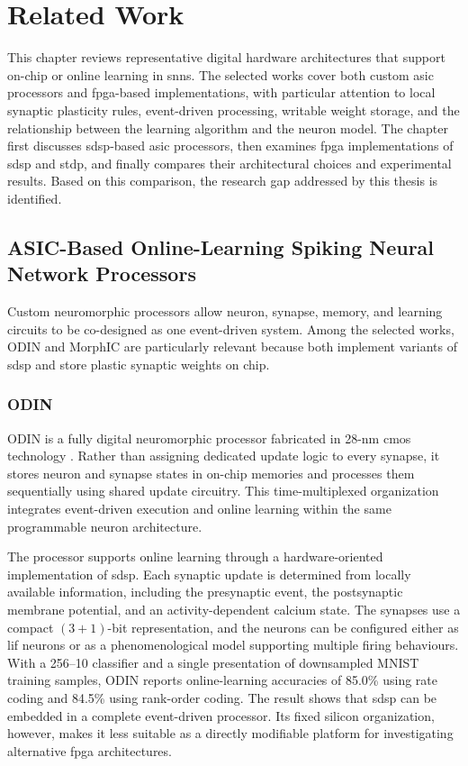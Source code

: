 \chapter{Related Work}
\label{sec:related_work}

This chapter reviews representative digital hardware architectures that support on-chip or online learning in \gls{snn}s. The selected works cover both custom \gls{asic} processors and \gls{fpga}-based implementations, with particular attention to local synaptic plasticity rules, event-driven processing, writable weight storage, and the relationship between the learning algorithm and the neuron model. The chapter first discusses \gls{sdsp}-based \gls{asic} processors, then examines \gls{fpga} implementations of \gls{sdsp} and \gls{stdp}, and finally compares their architectural choices and experimental results. Based on this comparison, the research gap addressed by this thesis is identified.

\section{ASIC-Based Online-Learning Spiking Neural Network Processors}
\label{subsec: asic online learning processors}

Custom neuromorphic processors allow neuron, synapse, memory, and learning circuits to be co-designed as one event-driven system. Among the selected works, ODIN and MorphIC are particularly relevant because both implement variants of \gls{sdsp} and store plastic synaptic weights on chip.

\subsection{ODIN}

ODIN is a fully digital neuromorphic processor fabricated in 28-nm \gls{cmos} technology \cite{Frenkel2019ODIN}. Rather than assigning dedicated update logic to every synapse, it stores neuron and synapse states in on-chip memories and processes them sequentially using shared update circuitry. This time-multiplexed organization integrates event-driven execution and online learning within the same programmable neuron architecture.

The processor supports online learning through a hardware-oriented implementation of \gls{sdsp}. Each synaptic update is determined from locally available information, including the presynaptic event, the postsynaptic membrane potential, and an activity-dependent calcium state. The synapses use a compact $(3+1)$-bit representation, and the neurons can be configured either as \gls{lif} neurons or as a phenomenological model supporting multiple firing behaviours. With a 256--10 classifier and a single presentation of downsampled MNIST training samples, ODIN reports online-learning accuracies of 85.0\% using rate coding and 84.5\% using rank-order coding. The result shows that \gls{sdsp} can be embedded in a complete event-driven processor. Its fixed silicon organization, however, makes it less suitable as a directly modifiable platform for investigating alternative \gls{fpga} architectures.

